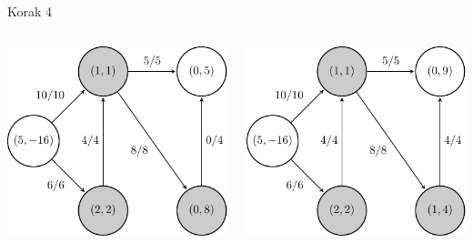 \documentclass{beamer}
\begin{document}
\begin{frame}{Korak 4}
    \begin{columns}
        \begin{column}{0.5\textwidth}
            \centering
            \includegraphics[scale=0.7]{../writing/images/graf2-5.pdf}
        \end{column}

        \begin{column}{0.5\textwidth}
            \centering
            \includegraphics[scale=0.7]{../writing/images/graf2-6.pdf}
        \end{column}
    \end{columns}
\end{frame}
\end{document}
